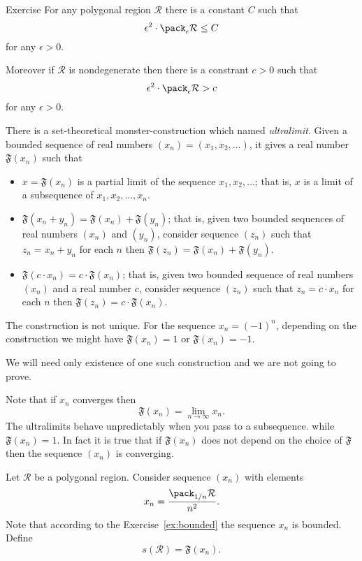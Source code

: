 \begin{thm}{Exercise}\label{ex:bounded}
For any polygonal region $\mathcal R$ there is a constant $C$ such that
$$\epsilon^2\cdot\pack_\epsilon \mathcal R\le C$$
for any $\epsilon>0$.

Moreover if $\mathcal R$ is nondegenerate then there is a constrant $c>0$ such that 
$$\epsilon^2\cdot\pack_\epsilon \mathcal R> c$$
for any $\epsilon>0$.
\end{thm}

There is a set-theoretical monster-construction
which named \emph{ultralimit}.
Given a bounded sequence of real numbers $(x_n)=(x_1,x_2,\dots)$,
it gives a real number $\mathfrak{F}(x_n)$ such that
\begin{itemize}
\item $x=\mathfrak{F}(x_n)$ is a partial limit of the sequence $x_1,x_2,\dots$; 
that is, $x$ is a limit of a subsequence of $x_1,x_2,\dots,x_n$.
\item $\mathfrak{F}(x_n+y_n)=\mathfrak{F}(x_n)+\mathfrak{F}(y_n)$;
that is, given two bounded sequences of real numbers $(x_n)$ and $(y_n)$, consider sequence $(z_n)$ such that $z_n=x_n+y_n$ for each $n$ then $\mathfrak{F}(z_n)=\mathfrak{F}(x_n)+\mathfrak{F}(y_n)$.
\item $\mathfrak{F}(c\cdot x_n)=c\cdot \mathfrak{F}(x_n)$;
that is, given two bounded sequence of real numbers $(x_n)$ and a real number $c$, consider sequence $(z_n)$ such that $z_n=c\cdot x_n$ for each $n$ then $\mathfrak{F}(z_n)=c\cdot \mathfrak{F}(x_n)$.
\end{itemize}

The construction is not unique. 
For the sequence $x_n=(-1)^n$,
depending on the construction we might have $\mathfrak{F}(x_n)=1$ or $\mathfrak{F}(x_n)=-1$.

We will need only existence of one such construction
and we are not going to prove. %

Note that if $x_n$ converges then
$$\mathfrak{F}(x_n)=\lim_{n\to\infty} x_n.$$
The ultralimits behave unpredictably when you pass to a subsequence.
 while
$\mathfrak{F}(x_n)=1$.
In fact it is true that if $\mathfrak{F}(x_n)$ does not depend on the choice of  $\mathfrak{F}$ then the sequence $(x_n)$ is converging.

Let $\mathcal R$ be a polygonal region.
Consider sequence $(x_n)$ with elements
$$x_n=\frac{\pack_{1/n} \mathcal R}{n^2}.$$
Note that according to the Exercise~\ref{ex:bounded} the sequence $x_n$ is bounded.
Define 
$$s(\mathcal R)=\mathfrak{F}(x_n).$$

